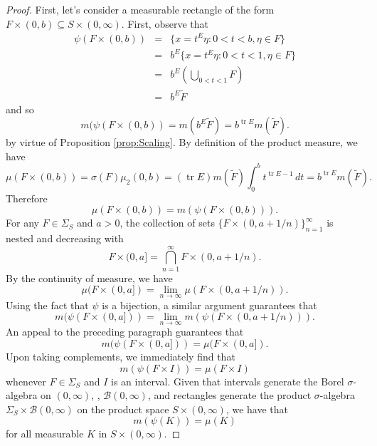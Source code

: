 \documentclass{article}
\theoremstyle{theorem}
\theoremstyle{remark}
\newcommand\tr{\operatorname{tr}}
\begin{document}
\begin{proof}
First, let's consider a measurable rectangle of the form $F\times (0,b)\subseteq S\times (0,\infty)$. First, observe that
\begin{eqnarray*}
\psi(F\times (0,b))&=&\{x=t^E \eta:0<t<b,\eta\in F\}\\
&=&b^{E}\{x=t^E\eta:0<t<1,\eta\in F\}\\
&=&b^{E}\left(\bigcup_{0<t<1} F\right)\\
&=&b^E\tilde F
\end{eqnarray*}
 and so
\begin{equation*}
m(\psi(F\times (0,b))=m(b^E\tilde F)=b^{\tr E}m(\tilde F).
\end{equation*}
by virtue of Proposition \ref{prop:Scaling}. By definition of the product measure, we have
\begin{equation*}
\mu(F\times (0,b))=\sigma(F)\mu_2(0,b)=(\tr E)m(\tilde F)\int_0^bt^{\tr E-1}\,dt=b^{\tr E}m(\tilde F).
\end{equation*}
Therefore
\begin{equation*}
\mu(F\times (0,b))=m(\psi(F\times (0,b))).
\end{equation*}
For any $F\in \Sigma_S$ and $a>0$, the collection of sets $\{F\times (0,a+1/n)\}_{n=1}^\infty$ is nested and decreasing with 
\begin{equation*}
F\times (0,a]=\bigcap_{n=1}^\infty F\times (0,a+1/n).
\end{equation*}
By the continuity of measure, we have
\begin{equation*}
\mu(F\times (0,a])=\lim_{n\to \infty}\mu(F\times (0,a+1/n)).
\end{equation*}
Using the fact that $\psi$ is a bijection, a similar argument guarantees that
\begin{equation*}
m(\psi(F\times (0,a]))=\lim_{n\to\infty}m(\psi(F\times (0,a+1/n))).
\end{equation*}
An appeal to the preceding paragraph guarantees that
\begin{equation*}
m(\psi(F\times (0,a]))=\mu(F\times (0,a]).
\end{equation*}
Upon taking complements, we immediately find that 
\begin{equation*}
m(\psi(F\times I))=\mu(F\times I)
\end{equation*}
whenever $F\in \Sigma_S$ and $I$ is an interval. Given that intervals generate the Borel $\sigma$-algebra on $(0,\infty)$, , $\mathcal{B}(0,\infty)$,  and rectangles generate the product $\sigma$-algebra $\Sigma_S\times \mathcal{B}(0,\infty)$ on the product space $S\times (0,\infty)$, we have that
\begin{equation*}
m(\psi(K))=\mu(K)
\end{equation*}
for all measurable $K$ in $S\times (0,\infty)$. 
\end{proof}
\end{document}
